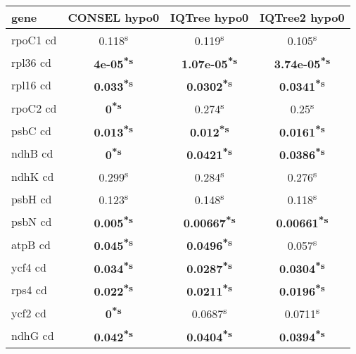 \documentclass[a4paper]{article}
\begin{document}
\footnotesize
{}
\begin{longtable}{l|c|c|c}
﻿gene&CONSEL hypo0&IQTree hypo0&IQTree2 hypo0\\
\hline
\endhead
rpoC1 cd&0.118\textsuperscript{s}&0.119\textsuperscript{s}&0.105\textsuperscript{s}\\
rpl36 cd&\textbf{4e-05\textsuperscript{*}\textsuperscript{s}}&\textbf{1.07e-05\textsuperscript{*}\textsuperscript{s}}&\textbf{3.74e-05\textsuperscript{*}\textsuperscript{s}}\\
rpl16 cd&\textbf{0.033\textsuperscript{*}\textsuperscript{s}}&\textbf{0.0302\textsuperscript{*}\textsuperscript{s}}&\textbf{0.0341\textsuperscript{*}\textsuperscript{s}}\\
rpoC2 cd&\textbf{0\textsuperscript{*}\textsuperscript{s}}&0.274\textsuperscript{s}&0.25\textsuperscript{s}\\
psbC cd&\textbf{0.013\textsuperscript{*}\textsuperscript{s}}&\textbf{0.012\textsuperscript{*}\textsuperscript{s}}&\textbf{0.0161\textsuperscript{*}\textsuperscript{s}}\\
ndhB cd&\textbf{0\textsuperscript{*}\textsuperscript{s}}&\textbf{0.0421\textsuperscript{*}\textsuperscript{s}}&\textbf{0.0386\textsuperscript{*}\textsuperscript{s}}\\
ndhK cd&0.299\textsuperscript{s}&0.284\textsuperscript{s}&0.276\textsuperscript{s}\\
psbH cd&0.123\textsuperscript{s}&0.148\textsuperscript{s}&0.118\textsuperscript{s}\\
psbN cd&\textbf{0.005\textsuperscript{*}\textsuperscript{s}}&\textbf{0.00667\textsuperscript{*}\textsuperscript{s}}&\textbf{0.00661\textsuperscript{*}\textsuperscript{s}}\\
atpB cd&\textbf{0.045\textsuperscript{*}\textsuperscript{s}}&\textbf{0.0496\textsuperscript{*}\textsuperscript{s}}&0.057\textsuperscript{s}\\
ycf4 cd&\textbf{0.034\textsuperscript{*}\textsuperscript{s}}&\textbf{0.0287\textsuperscript{*}\textsuperscript{s}}&\textbf{0.0304\textsuperscript{*}\textsuperscript{s}}\\
rps4 cd&\textbf{0.022\textsuperscript{*}\textsuperscript{s}}&\textbf{0.0211\textsuperscript{*}\textsuperscript{s}}&\textbf{0.0196\textsuperscript{*}\textsuperscript{s}}\\
ycf2 cd&\textbf{0\textsuperscript{*}\textsuperscript{s}}&0.0687\textsuperscript{s}&0.0711\textsuperscript{s}\\
ndhG cd&\textbf{0.042\textsuperscript{*}\textsuperscript{s}}&\textbf{0.0404\textsuperscript{*}\textsuperscript{s}}&\textbf{0.0394\textsuperscript{*}\textsuperscript{s}}\\

\end{longtable}
\end{document}
